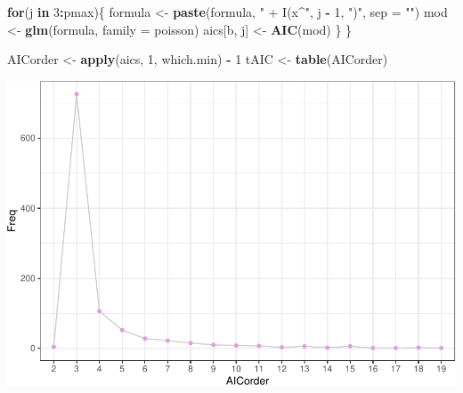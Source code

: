 \documentclass[]{article}
\newenvironment{Shaded}{\begin{snugshade}}{\end{snugshade}}
\newcommand{\ControlFlowTok}[1]{\textcolor[rgb]{0.13,0.29,0.53}{\textbf{#1}}}
\newcommand{\DataTypeTok}[1]{\textcolor[rgb]{0.13,0.29,0.53}{#1}}
\newcommand{\DecValTok}[1]{\textcolor[rgb]{0.00,0.00,0.81}{#1}}
\newcommand{\KeywordTok}[1]{\textcolor[rgb]{0.13,0.29,0.53}{\textbf{#1}}}
\newcommand{\NormalTok}[1]{#1}
\newcommand{\OperatorTok}[1]{\textcolor[rgb]{0.81,0.36,0.00}{\textbf{#1}}}
\newcommand{\StringTok}[1]{\textcolor[rgb]{0.31,0.60,0.02}{#1}}
\begin{document}
\begin{Shaded}
\begin{Highlighting}[]
  \ControlFlowTok{for}\NormalTok{(j }\ControlFlowTok{in} \DecValTok{3}\OperatorTok{:}\NormalTok{pmax)\{}
\NormalTok{    formula <-}\StringTok{ }\KeywordTok{paste}\NormalTok{(formula, }\StringTok{" + I(x^"}\NormalTok{, j }\OperatorTok{-}\StringTok{ }\DecValTok{1}\NormalTok{, }\StringTok{")"}\NormalTok{, }\DataTypeTok{sep =} \StringTok{""}\NormalTok{)}
\NormalTok{    mod <-}\StringTok{ }\KeywordTok{glm}\NormalTok{(formula, }\DataTypeTok{family =}\NormalTok{ poisson)}
\NormalTok{    aics[b, j] <-}\StringTok{ }\KeywordTok{AIC}\NormalTok{(mod)}
\NormalTok{  \}}
\NormalTok{\}}

\NormalTok{AICorder <-}\StringTok{ }\KeywordTok{apply}\NormalTok{(aics, }\DecValTok{1}\NormalTok{, which.min) }\OperatorTok{-}\StringTok{ }\DecValTok{1}
\NormalTok{tAIC <-}\StringTok{ }\KeywordTok{table}\NormalTok{(AICorder)}
\end{Highlighting}
\end{Shaded}

\begin{Shaded}
\end{Shaded}

\includegraphics{exercises_files/figure-latex/unnamed-chunk-2-1.pdf}
\end{document}
